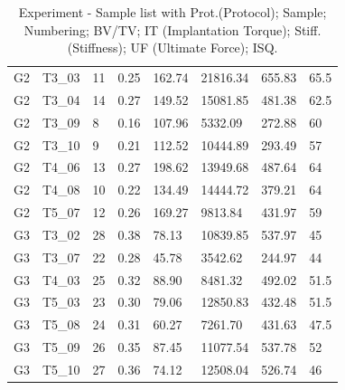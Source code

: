 \documentclass[12pt, a4paper, twoside]{report}
\begin{document}
\begin{table}[H]
\begin{tabular}{l|l|l|l|l|l|l|l}
G2       & T3\_03 & 11 & 0.25          & 162.74            & 21816.34             & 655.83                 & 65.5        \\
G2       & T3\_04 & 14 & 0.27          & 149.52            & 15081.85             & 481.38                 & 62.5        \\
G2       & T3\_09 & 8 & 0.16          & 107.96            & 5332.09              & 272.88                 & 60          \\
G2       & T3\_10 & 9 & 0.21          & 112.52            & 10444.89             & 293.49                 & 57          \\
G2       & T4\_06 & 13 & 0.27          & 198.62            & 13949.68             & 487.64                 & 64          \\
G2       & T4\_08 & 10 & 0.22          & 134.49            & 14444.72             & 379.21                 & 64          \\
G2       & T5\_07 & 12 & 0.26          & 169.27            & 9813.84              & 431.97                 & 59          \\
G3       & T3\_02 & 28 & 0.38          & 78.13             & 10839.85             & 537.97                 & 45          \\
G3       & T3\_07 & 22 & 0.28          & 45.78             & 3542.62              & 244.97                 & 44          \\
G3       & T4\_03 & 25 & 0.32          & 88.90             & 8481.32              & 492.02                 & 51.5        \\
G3       & T5\_03 & 23 & 0.30          & 79.06             & 12850.83             & 432.48                 & 51.5        \\
G3       & T5\_08 & 24 & 0.31          & 60.27             & 7261.70              & 431.63                 & 47.5        \\
G3       & T5\_09 & 26 & 0.35          & 87.45             & 11077.54             & 537.78                 & 52          \\
G3       & T5\_10 & 27 & 0.36          & 74.12             & 12508.04             & 526.74                 & 46         
\end{tabular}
\caption{Experiment - Sample list with Prot.(Protocol); Sample; Numbering; BV/TV; IT (Implantation Torque); Stiff. (Stiffness); UF (Ultimate Force); ISQ.}
\label{tab:TabSamples}
\end{table}
%
\newpage
\end{document}
